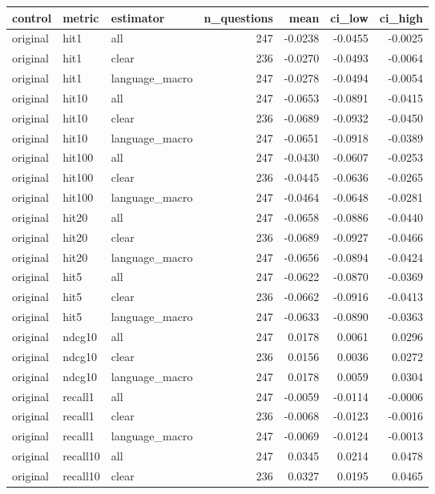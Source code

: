 \begin{tabular}{lllrrrr}
\toprule
control & metric & estimator & n\_questions & mean & ci\_low & ci\_high \\
\midrule
original & hit1 & all & 247 & -0.0238 & -0.0455 & -0.0025 \\
original & hit1 & clear & 236 & -0.0270 & -0.0493 & -0.0064 \\
original & hit1 & language\_macro & 247 & -0.0278 & -0.0494 & -0.0054 \\
original & hit10 & all & 247 & -0.0653 & -0.0891 & -0.0415 \\
original & hit10 & clear & 236 & -0.0689 & -0.0932 & -0.0450 \\
original & hit10 & language\_macro & 247 & -0.0651 & -0.0918 & -0.0389 \\
original & hit100 & all & 247 & -0.0430 & -0.0607 & -0.0253 \\
original & hit100 & clear & 236 & -0.0445 & -0.0636 & -0.0265 \\
original & hit100 & language\_macro & 247 & -0.0464 & -0.0648 & -0.0281 \\
original & hit20 & all & 247 & -0.0658 & -0.0886 & -0.0440 \\
original & hit20 & clear & 236 & -0.0689 & -0.0927 & -0.0466 \\
original & hit20 & language\_macro & 247 & -0.0656 & -0.0894 & -0.0424 \\
original & hit5 & all & 247 & -0.0622 & -0.0870 & -0.0369 \\
original & hit5 & clear & 236 & -0.0662 & -0.0916 & -0.0413 \\
original & hit5 & language\_macro & 247 & -0.0633 & -0.0890 & -0.0363 \\
original & ndcg10 & all & 247 & 0.0178 & 0.0061 & 0.0296 \\
original & ndcg10 & clear & 236 & 0.0156 & 0.0036 & 0.0272 \\
original & ndcg10 & language\_macro & 247 & 0.0178 & 0.0059 & 0.0304 \\
original & recall1 & all & 247 & -0.0059 & -0.0114 & -0.0006 \\
original & recall1 & clear & 236 & -0.0068 & -0.0123 & -0.0016 \\
original & recall1 & language\_macro & 247 & -0.0069 & -0.0124 & -0.0013 \\
original & recall10 & all & 247 & 0.0345 & 0.0214 & 0.0478 \\
original & recall10 & clear & 236 & 0.0327 & 0.0195 & 0.0465 \\

\end{tabular}

